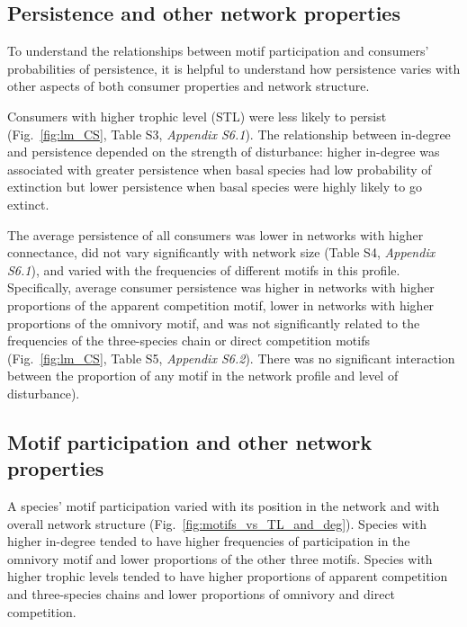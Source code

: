 \documentclass[12pt]{article}
\begin{document}
\begin{spacing}{2.0}
    \subsection*{Persistence and other network properties}

        To understand the relationships between motif participation and consumers' probabilities of persistence, it is helpful to understand how persistence varies with other aspects of both consumer properties and network structure.
        
        Consumers with higher trophic level (STL) were less likely to persist (Fig.~\ref{fig:lm_CS}, Table S3, \emph{Appendix S6.1}).
        The relationship between in-degree and persistence depended on the strength of disturbance: higher in-degree was associated with greater persistence when basal species had low probability of extinction but lower persistence when basal species were highly likely to go extinct.


        The average persistence of all consumers was lower in networks with higher connectance, did not vary significantly with network size (Table S4, \emph{Appendix S6.1}), and  varied with the frequencies of different motifs in this profile.
        Specifically, average consumer persistence was higher in networks with higher proportions of the apparent competition motif, lower in networks with higher proportions of the omnivory motif, and was not significantly related to the frequencies of the three-species chain or direct competition motifs (Fig.~\ref{fig:lm_CS}, Table S5, \emph{Appendix S6.2}). 
        There was no significant interaction between the proportion of any motif in the network profile and level of disturbance).


    \subsection*{Motif participation and other network properties}


        A species' motif participation varied with its position in the network and with overall network structure (Fig.~\ref{fig:motifs_vs_TL_and_deg}).
        Species with higher in-degree tended to have higher frequencies of participation in the omnivory motif and lower proportions of the other three motifs.
        Species with higher trophic levels tended to have higher proportions of apparent competition and three-species chains and lower proportions of omnivory and direct competition. 
        

\end{spacing}
\end{document}
